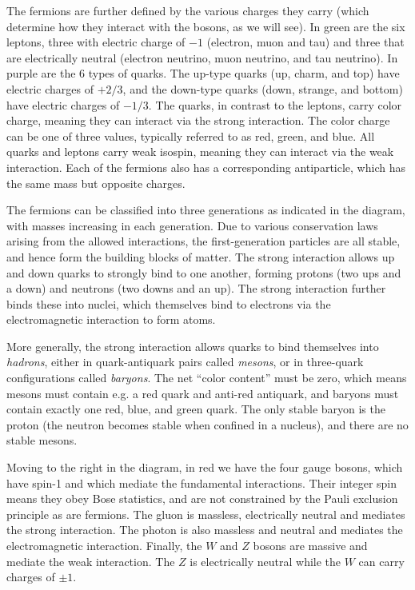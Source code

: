 The fermions are further defined by the various charges they carry (which determine how they
interact with the bosons, as we will see). In green are the six leptons, three with electric charge
of $-1$ (electron, muon and tau) and three that are electrically neutral (electron neutrino, muon
neutrino, and tau neutrino). In purple are the 6 types of quarks. The up-type quarks (up, charm, and top)
have electric charges of $+2/3$, and the down-type quarks (down, strange, and bottom) have electric
charges of $-1/3$. The quarks, in contrast to the leptons, carry color charge, meaning they
can interact via the strong interaction. The color charge can be one of three values, typically
referred to as red, green, and blue.
All quarks and leptons carry weak isospin, meaning they can interact
via the weak interaction. Each of the fermions also has a corresponding antiparticle, which has the same
mass but opposite charges.

The fermions can be classified into three generations as indicated in the diagram, with masses
increasing in each generation. Due to various conservation laws arising from the allowed 
interactions, the first-generation particles are all stable, and hence form the building
blocks of matter. The strong interaction allows up and down quarks to strongly bind to
one another, forming protons (two ups and a down) and neutrons (two downs and an up).
The strong interaction further binds these into nuclei, which themselves bind to electrons via the electromagnetic
interaction to form atoms.

More generally, the strong interaction allows quarks to bind themselves into \textit{hadrons}, either in quark-antiquark
pairs called \textit{mesons}, or in three-quark configurations called \textit{baryons}. The net ``color content''
must be zero, which means mesons must contain e.g. a red quark and anti-red antiquark, and baryons
must contain exactly one red, blue, and green quark. The only stable baryon is the proton (the neutron
becomes stable when confined in a nucleus), and there are no stable mesons.

Moving to the right in the diagram, in red we have the four gauge bosons, which have spin-1
and which mediate the fundamental interactions. Their integer spin means they obey Bose statistics,
and are not constrained by the Pauli exclusion principle as are fermions. 
The gluon is massless, electrically neutral and mediates the strong
interaction. The photon is also massless and neutral and mediates the electromagnetic interaction. Finally,
the $W$ and $Z$ bosons are massive and mediate the weak interaction. The $Z$ is electrically neutral while 
the $W$ can carry charges of $\pm1$.

